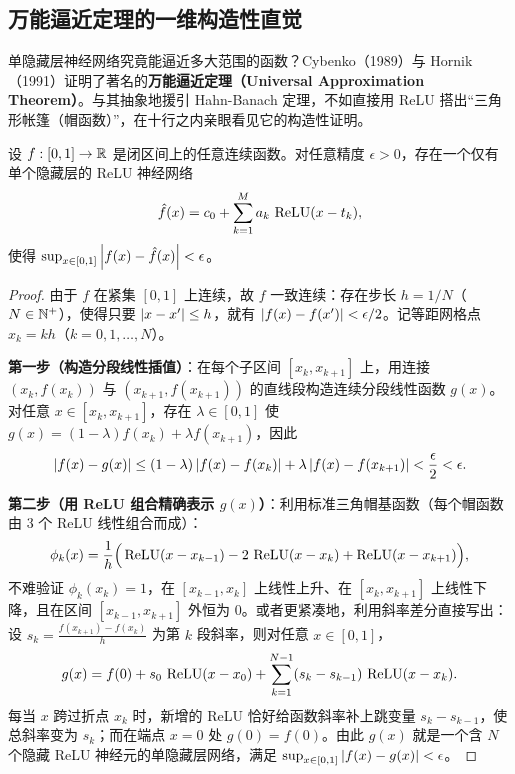 \subsection{万能逼近定理的一维构造性直觉}

单隐藏层神经网络究竟能逼近多大范围的函数？Cybenko（1989）与 Hornik（1991）证明了著名的\textbf{万能逼近定理（Universal Approximation Theorem）}。与其抽象地援引 Hahn-Banach 定理，不如直接用 ReLU 搭出“三角形帐篷（帽函数）”，在十行之内亲眼看见它的构造性证明。

\begin{thmBox}
\begin{theorem}
\label{thm:uat-1d}
设 $f: [0, 1] \to \mathbb{R}$ 是闭区间上的任意连续函数。对任意精度 $\epsilon > 0$，存在一个仅有单个隐藏层的 ReLU 神经网络
\[
  \hat{f}(x) = c_0 + \sum_{k=1}^{M} a_k\,\operatorname{ReLU}(x - t_k),
\]
使得 $\sup_{x \in [0, 1]} \left|f(x) - \hat{f}(x)\right| < \epsilon$。
\end{theorem}
\begin{proof}
由于 $f$ 在紧集 $[0, 1]$ 上连续，故 $f$ 一致连续：存在步长 $h = 1/N$（$N \in \mathbb{N}^+$），使得只要 $\left|x - x'\right| \le h$，就有 $\left|f(x) - f(x')\right| < \epsilon/2$。记等距网格点 $x_k = k h$（$k = 0, 1, \dots, N$）。

\textbf{第一步（构造分段线性插值）}：在每个子区间 $[x_k, x_{k+1}]$ 上，用连接 $(x_k, f(x_k))$ 与 $(x_{k+1}, f(x_{k+1}))$ 的直线段构造连续分段线性函数 $g(x)$。对任意 $x \in [x_k, x_{k+1}]$，存在 $\lambda \in [0, 1]$ 使 $g(x) = (1-\lambda)f(x_k) + \lambda f(x_{k+1})$，因此
\[
  \left|f(x) - g(x)\right| \le (1-\lambda)\left|f(x) - f(x_k)\right| + \lambda \left|f(x) - f(x_{k+1})\right| < \frac{\epsilon}{2} < \epsilon.
\]

\textbf{第二步（用 ReLU 组合精确表示 $g(x)$）}：利用标准三角帽基函数（每个帽函数由 3 个 ReLU 线性组合而成）：
\[
  \phi_k(x) = \frac{1}{h}\Big(\operatorname{ReLU}(x - x_{k-1}) - 2\,\operatorname{ReLU}(x - x_k) + \operatorname{ReLU}(x - x_{k+1})\Big),
\]
不难验证 $\phi_k(x_k) = 1$，在 $[x_{k-1}, x_k]$ 上线性上升、在 $[x_k, x_{k+1}]$ 上线性下降，且在区间 $[x_{k-1}, x_{k+1}]$ 外恒为 $0$。或者更紧凑地，利用斜率差分直接写出：设 $s_k = \frac{f(x_{k+1}) - f(x_k)}{h}$ 为第 $k$ 段斜率，则对任意 $x \in [0, 1]$，
\[
  g(x) = f(0) + s_0\,\operatorname{ReLU}(x - x_0) + \sum_{k=1}^{N-1} (s_k - s_{k-1})\,\operatorname{ReLU}(x - x_k).
\]
每当 $x$ 跨过折点 $x_k$ 时，新增的 ReLU 恰好给函数斜率补上跳变量 $s_k - s_{k-1}$，使总斜率变为 $s_k$；而在端点 $x=0$ 处 $g(0) = f(0)$。由此 $g(x)$ 就是一个含 $N$ 个隐藏 ReLU 神经元的单隐藏层网络，满足 $\sup_{x \in [0,1]}\left|f(x) - g(x)\right| < \epsilon$。
\end{proof}
\end{thmBox}

